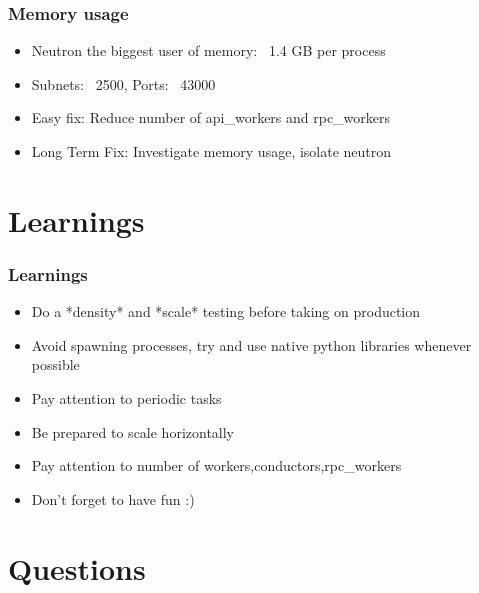 \documentclass[aspectratio=169,11pt,hyperref={colorlinks=true}]{beamer}
\begin{document}
\begin{frame}
    \frametitle{Memory usage}
    \begin{itemize}[<+-| alert@+>]
        \item Neutron the biggest user of memory: ~1.4 GB per process
        \item Subnets: ~2500, Ports: ~43000
        \item Easy fix: Reduce  number of api\_workers and rpc\_workers
        \item Long Term Fix: Investigate memory usage, isolate neutron
    \end{itemize}
\end{frame}

\section{Learnings}
\begin{frame}
    \frametitle{Learnings}
    \begin{itemize}[<+-| alert@+>]
        \item Do a *density* and *scale* testing before taking on production
        \item Avoid spawning processes, try and use native python libraries whenever possible
        \item Pay attention to periodic tasks
        \item Be prepared to scale horizontally
        \item Pay attention to number of workers,conductors,rpc\_workers
        \item Don't forget to have fun :)
    \end{itemize}
\end{frame}


\section{Questions}
\end{document}
